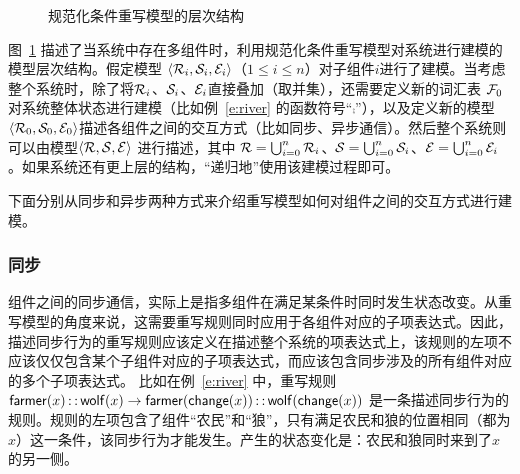 \begin{figure}[ht]
\centering
{}
\caption{规范化条件重写模型的层次结构}
\label{f:layered-model}
\end{figure}

图~\ref{f:layered-model} 描述了当系统中存在多组件时，利用规范化条件重写模型对系统进行建模的模型层次结构。假定模型 $\langle \mathcal{R}_i,\mathcal{S}_i,\mathcal{E}_i\rangle$（$1\le i\le n$）对子组件$i$进行了建模。当考虑整个系统时，除了将$\mathcal{R}_i$、$\mathcal{S}_i$、$\mathcal{E}_i$直接叠加（取并集），还需要定义新的词汇表 $\mathcal{F}_0$ 对系统整体状态进行建模（比如例~\ref{e:river} 的函数符号“$\comp$”），以及定义新的模型$\langle \mathcal{R}_0,\mathcal{S}_0,\mathcal{E}_0\rangle$描述各组件之间的交互方式（比如同步、异步通信）。然后整个系统则可以由模型$\langle \mathcal{R},\mathcal{S},\mathcal{E}\rangle$ 进行描述，其中 $\mathcal{R} = \bigcup^n_{i=0}\mathcal{R}_i$、$\mathcal{S} = \bigcup^n_{i=0}\mathcal{S}_i$、$\mathcal{E} = \bigcup^n_{i=0}\mathcal{E}_i$。如果系统还有更上层的结构，“递归地”使用该建模过程即可。

下面分别从同步和异步两种方式来介绍重写模型如何对组件之间的交互方式进行建模。

\subsubsection{同步}
\label{ss:sync}

组件之间的同步通信，实际上是指多组件在满足某条件时同时发生状态改变。从重写模型的角度来说，这需要重写规则同时应用于各组件对应的子项表达式。因此，描述同步行为的重写规则应该定义在描述整个系统的项表达式上，该规则的左项不应该仅仅包含某个子组件对应的子项表达式，而应该包含同步涉及的所有组件对应的多个子项表达式。
比如在例~\ref{e:river} 中，重写规则 $\operatorname{\mathsf{farmer}}(x)\operatorname{\mathsf{::}} \operatorname{\mathsf{wolf}}(x) \rightarrow \operatorname{\mathsf{farmer}}(\operatorname{\mathsf{change}}(x))\operatorname{\mathsf{::}}\operatorname{\mathsf{wolf}}(\operatorname{\mathsf{change}}(x))$ 是一条描述同步行为的规则。规则的左项包含了组件“农民”和“狼”，只有满足农民和狼的位置相同（都为$x$）这一条件，该同步行为才能发生。产生的状态变化是：农民和狼同时来到了$x$的另一侧。

